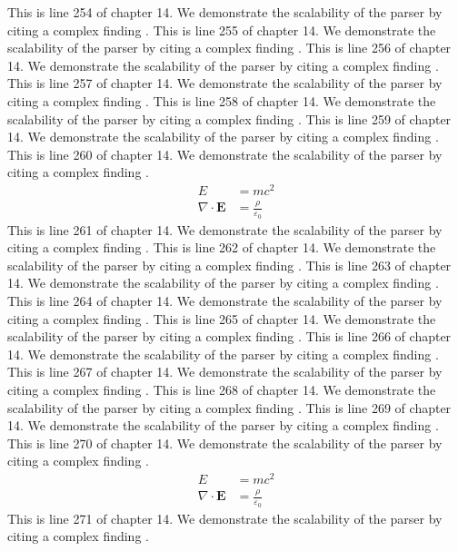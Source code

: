 This is line 254 of chapter 14. We demonstrate the scalability of the parser by citing a complex finding \cite{ref14_254}.
This is line 255 of chapter 14. We demonstrate the scalability of the parser by citing a complex finding \cite{ref14_255}.
This is line 256 of chapter 14. We demonstrate the scalability of the parser by citing a complex finding \cite{ref14_256}.
This is line 257 of chapter 14. We demonstrate the scalability of the parser by citing a complex finding \cite{ref14_257}.
This is line 258 of chapter 14. We demonstrate the scalability of the parser by citing a complex finding \cite{ref14_258}.
This is line 259 of chapter 14. We demonstrate the scalability of the parser by citing a complex finding \cite{ref14_259}.
This is line 260 of chapter 14. We demonstrate the scalability of the parser by citing a complex finding \cite{ref14_260}.
\begin{align*}
  E &= mc^2 \\
  \nabla \cdot \mathbf{E} &= \frac{\rho}{\varepsilon_0}
\end{align*}
This is line 261 of chapter 14. We demonstrate the scalability of the parser by citing a complex finding \cite{ref14_261}.
This is line 262 of chapter 14. We demonstrate the scalability of the parser by citing a complex finding \cite{ref14_262}.
This is line 263 of chapter 14. We demonstrate the scalability of the parser by citing a complex finding \cite{ref14_263}.
This is line 264 of chapter 14. We demonstrate the scalability of the parser by citing a complex finding \cite{ref14_264}.
This is line 265 of chapter 14. We demonstrate the scalability of the parser by citing a complex finding \cite{ref14_265}.
This is line 266 of chapter 14. We demonstrate the scalability of the parser by citing a complex finding \cite{ref14_266}.
This is line 267 of chapter 14. We demonstrate the scalability of the parser by citing a complex finding \cite{ref14_267}.
This is line 268 of chapter 14. We demonstrate the scalability of the parser by citing a complex finding \cite{ref14_268}.
This is line 269 of chapter 14. We demonstrate the scalability of the parser by citing a complex finding \cite{ref14_269}.
This is line 270 of chapter 14. We demonstrate the scalability of the parser by citing a complex finding \cite{ref14_270}.
\begin{align*}
  E &= mc^2 \\
  \nabla \cdot \mathbf{E} &= \frac{\rho}{\varepsilon_0}
\end{align*}
This is line 271 of chapter 14. We demonstrate the scalability of the parser by citing a complex finding \cite{ref14_271}.
